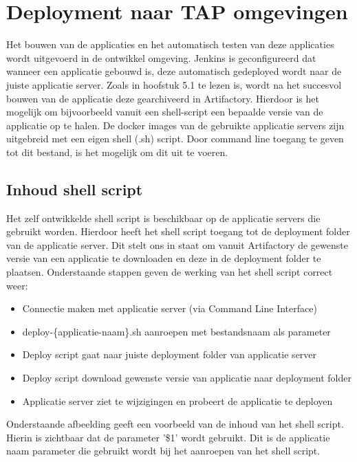 \section{Deployment naar TAP omgevingen}
Het bouwen van de applicaties en het automatisch testen van deze applicaties wordt uitgevoerd in de ontwikkel omgeving. Jenkins is geconfigureerd dat wanneer een applicatie gebouwd is, deze automatisch gedeployed wordt naar de juiste applicatie server.
\newline
Zoals in hoofstuk 5.1 te lezen is, wordt na het succesvol bouwen van de applicatie deze gearchiveerd in Artifactory. Hierdoor is het mogelijk om bijvoorbeeld vanuit een shell-script een bepaalde versie van de applicatie op te halen.
\newline
De docker images van de gebruikte applicatie servers zijn uitgebreid met een eigen shell (.sh) script. Door command line toegang te geven tot dit bestand, is het mogelijk om dit uit te voeren.
\subsection{Inhoud shell script}
Het zelf ontwikkelde shell script is beschikbaar op de applicatie servers die gebruikt worden. Hierdoor heeft het shell script toegang tot de deployment folder van de applicatie server. Dit stelt ons in staat om vanuit Artifactory de gewenste versie van een applicatie te downloaden en deze in de deployment folder te plaatsen. Onderstaande stappen geven de werking van het shell script correct weer:
\begin{itemize}
	\setlength\itemsep{0em}
	\item Connectie maken met applicatie server (via Command Line Interface)
	\item deploy-\{applicatie-naam\}.sh aanroepen met bestandsnaam als parameter
	\item Deploy script gaat naar juiste deployment folder van applicatie server
	\item Deploy script download gewenste versie van applicatie naar deployment folder
	\item Applicatie server ziet te wijzigingen en probeert de applicatie te deployen
\end{itemize}
Onderstaande afbeelding geeft een voorbeeld van de inhoud van het shell script. Hierin is zichtbaar dat de parameter '\$1' wordt gebruikt. Dit is de applicatie naam parameter die gebruikt wordt bij het aanroepen van het shell script.

